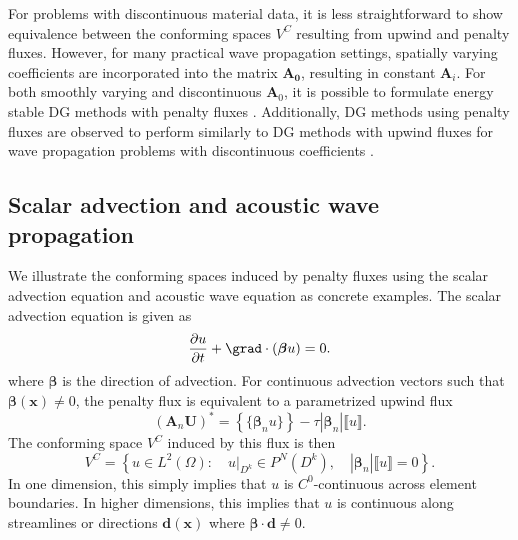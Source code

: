 \documentclass[10pt]{article}
\renewcommand{\div}{\grad \cdot}
\newcommand{\pd}[2]{\frac{\partial#1}{\partial#2}}
\newcommand{\LRp}[1]{\left( #1 \right)}
\newcommand{\LRb}[1]{\left| #1 \right|}
\newcommand{\LRc}[1]{\left\{ #1 \right\}}
\newcommand{\jump}[1] {\ensuremath{\llbracket#1\rrbracket}}
\newcommand{\avg}[1] {\ensuremath{\LRc{\!\{#1\}\!}}}
\begin{document}
For problems with discontinuous material data, it is less straightforward to show equivalence between the conforming spaces $V^C$ resulting from upwind and penalty fluxes.  However, for many practical wave propagation settings, spatially varying coefficients are incorporated into the matrix $\bm{A_0}$, resulting in constant $\bm{A}_i$.  For both smoothly varying and discontinuous $\bm{A}_0$, it is possible to formulate energy stable DG methods with penalty fluxes \cite{mercerat2015nodal, chan2016weight1}.  Additionally, DG methods using penalty fluxes are observed to perform similarly to DG methods with upwind fluxes for  wave propagation problems with discontinuous coefficients \cite{warburton2013low, chan2016weight1, ye2016discontinuous}.  

\subsection{Scalar advection and acoustic wave propagation}
\label{sec:confexamples}
We illustrate the conforming spaces induced by penalty fluxes using the scalar advection equation and acoustic wave equation as concrete examples.  The scalar advection equation is given as
\[
\pd{u}{t} + \div\LRp{\bm{\beta}u} = 0.
\]
where $\bm{\beta}$ is the direction of advection.  For continuous advection vectors such that $\bm{\beta}(\bm{x}) \neq 0$, the penalty flux is equivalent to a parametrized upwind flux \cite{hesthaven2007nodal}
\[
(\bm{A}_n\bm{U})^* = \avg{\bm{\beta}_n u} - \tau\LRb{\bm{\beta}_n}\jump{u}.
\]
The conforming space $V^C$ induced by this flux is then
\[
V^C = \LRc{ u \in L^2\LRp{\Omega} : \quad \left.u\right|_{D^k} \in P^N(D^k), \quad \LRb{\bm{\beta}_n}\jump{u} = 0}.
\]
In one dimension, this simply implies that $u$ is $C^0$-continuous across element boundaries.  In higher dimensions, this implies that $u$ is continuous along streamlines or directions $\bm{d}(\bm{x})$ where $\bm{\beta}\cdot \bm{d} \neq 0$.  
\end{document}
